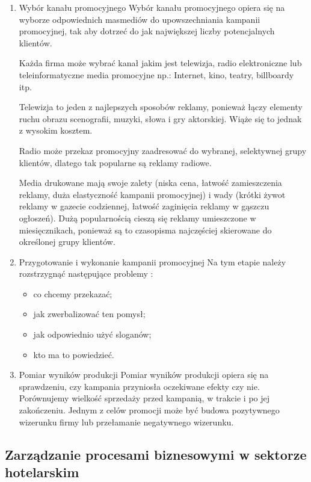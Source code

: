 \documentclass[a4paper, 12pt]{article}
\begin{document}
\begin{enumerate}
	\item Wybór kanału promocyjnego
	\newline Wybór kanału promocyjnego opiera się na wyborze odpowiednich masmediów do upowszechniania kampanii promocyjnej, tak aby dotrzeć do jak największej liczby potencjalnych klientów.
	
	Każda firma może wybrać kanał jakim jest telewizja, radio elektroniczne lub teleinformatyczne media promocyjne np.: Internet, kino, teatry, billboardy itp.
	
	Telewizja to jeden z najlepszych sposobów reklamy, ponieważ łączy elementy ruchu obrazu scenografii, muzyki, słowa i gry aktorskiej. Wiąże się to jednak z wysokim kosztem.
	
	Radio może przekaz promocyjny zaadresować do wybranej, selektywnej grupy klientów, dlatego tak popularne są reklamy radiowe.
	
	Media drukowane mają swoje zalety (niska cena, łatwość zamieszczenia reklamy, duża elastyczność kampanii promocyjnej) i wady (krótki żywot reklamy w gazecie codziennej, łatwość zaginięcia reklamy w gąszczu ogłoszeń). Dużą popularnością cieszą się reklamy umieszczone w miesięcznikach, ponieważ są to czasopisma najczęściej skierowane do określonej grupy klientów.
	
	\item Przygotowanie i wykonanie kampanii promocyjnej
	\newline Na tym etapie należy rozstrzygnąć następujące problemy :
	\begin{itemize}
		\item co chcemy przekazać;
		\item jak zwerbalizować ten pomysł;
		\item jak odpowiednio użyć sloganów;
		\item kto ma to powiedzieć.
		
	\end{itemize}
	\item Pomiar wyników produkcji
	\newline Pomiar wyników produkcji opiera się na sprawdzeniu, czy kampania przyniosła oczekiwane efekty czy nie. Porównujemy wielkość sprzedaży przed kampanią, w trakcie i po jej zakończeniu. Jednym z celów promocji może być budowa pozytywnego wizerunku firmy lub przełamanie negatywnego wizerunku.
	
\end{enumerate}

\subsection{Zarządzanie procesami biznesowymi w sektorze hotelarskim}
\end{document}
